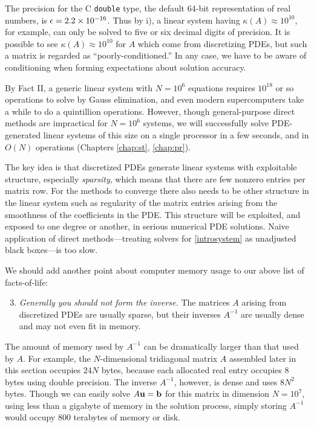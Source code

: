 The precision for the C \texttt{double} type, the default 64-bit representation of real numbers, is $\epsilon = 2.2 \times 10^{-16}$.  Thus by i), a linear system having $\kappa(A) \approx 10^{10}$, for example, can only be solved to five or six decimal digits of precision.  It is possible to see $\kappa(A)\approx 10^{10}$ for $A$ which come from discretizing PDEs, but such a matrix is regarded as ``poorly-conditioned.''  In any case, we have to be aware of conditioning when forming expectations about solution accuracy.

By Fact II, a generic linear system with $N=10^6$ equations requires $10^{18}$ or so operations to solve by Gauss elimination, and even modern supercomputers take a while to do a quintillion operations.  However, though general-purpose direct methods are impractical for $N=10^6$ systems, we will successfully solve PDE-generated linear systems of this size on a single processor in a few seconds, and in $O(N)$ operations (Chapters \ref{chap:st}, \ref{chap:pr}).

The key idea is that discretized PDEs generate linear systems with exploitable structure, especially \emph{sparsity}, which means that there are few nonzero entries per matrix row.  For the methods to converge there also needs to be other structure in the linear system such as regularity of the matrix entries arising from the smoothness of the coefficients in the PDE.  This structure will be exploited, and exposed to one degree or another, in serious numerical PDE solutions.  Naive application of direct methods---treating solvers for \eqref{introsystem} as unadjusted black boxes---is too slow.

We should add another point about computer memory usage to our above list of facts-of-life:
\begin{enumerate}
\setcounter{enumi}{2}
\item \emph{Generally you should not form the inverse.}  The matrices $A$ arising from discretized PDEs are usually sparse, but their inverses $A^{-1}$ are usually dense and may not even fit in memory.
\end{enumerate}
The amount of memory used by $A^{-1}$ can be dramatically larger than that used by $A$.  For example, the $N$-dimensional tridiagonal matrix $A$ assembled later in this section occupies $24 N$ bytes, because each allocated real entry occupies 8 bytes using double precision.  The inverse $A^{-1}$, however, is dense and uses $8 N^2$ bytes.  Though we can easily solve $A\mathbf{u}=\mathbf{b}$ for this matrix in dimension $N=10^7$, using less than a gigabyte of memory in the solution process, simply storing $A^{-1}$ would occupy $800$ terabytes of memory or disk.


